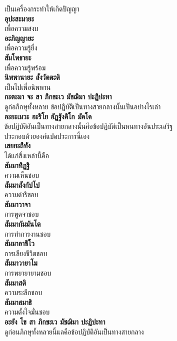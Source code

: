 \documentclass[12pt]{article}
\begin{document}
\indent เป็นเครื่องกระทำให้เกิดปัญญา\\
\textbf{อุปะสะมายะ}\\
\indent เพื่อความสงบ\\
\textbf{อะภิญญายะ}\\
\indent เพื่อความรู้ยิ่ง\\
\textbf{สัมโพธายะ}\\
\indent เพื่อความรู้พร้อม\\
\textbf{นิพพานายะ สังวัตตะติ}\\
\indent เป็นไปเพื่อนิพพาน\\
\textbf{กะตะมา จะ สา ภิกขะเว มัชฌิมา ปะฏิปะทา}\\
\indent ดูก่อภิกษุทั้งหลาย ข้อปฏิบัติเป็นทางสายกลางนั้นเป็นอย่างไรเล่า\\
\textbf{อะยะเมวะ อะริโย อัฏฐังคิโก มัคโค}\\
\indent ข้อปฏิบัติอันเป็นทางสายกลางนั้นคือข้อปฏิบัติเป็นหนทางอันประเสริฐ\\
\indent ประกอบด้วยองค์แปดประการนี้เอง\\
\textbf{เสยยะถีทัง}\\
\indent ได้แก่สิ่งเหล่านี้คือ\\
\textbf{สัมมาทิฏฐิ}\\
\indent ความเห็นชอบ\\
\textbf{สัมมาสังกัปโป}\\
\indent ความดำริชอบ\\
\textbf{สัมมาวาจา}\\
\indent การพูดจาชอบ\\
\textbf{สัมมากัมมันโต}\\
\indent การทำการงานชอบ\\
\textbf{สัมมาอาชีโว}\\
\indent การเลียงชีวิตชอบ\\
\textbf{สัมมาวายาโม}\\
\indent การพยายายามชอบ\\
\textbf{สัมมาสติ}\\
\indent ความระลึกชอบ\\
\textbf{สัมมาสมาธิ}\\
\indent ความตั้งใจมั่นชอบ\\
\textbf{อะยัง โข สา ภิกขะเว มัชฌิมา ปะฏิปะทา}\\
\indent ดูก่อนภิกษุทั้งหลายนี้แลคือข้อปฏิบัติอันเป็นทางสายกลาง\\

\pagebreak
\end{document}
